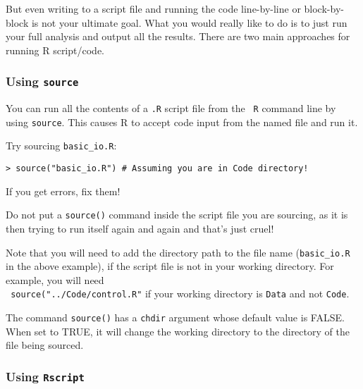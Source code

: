 But even writing to a script file and running the code line-by-line or 
block-by-block is not your ultimate goal. What you would really like to 
do is to just run your full analysis and output all the results. There 
are two main approaches for running R script/code.

\subsubsection{Using {\tt source}}


You can run all the contents of a {\tt *.R} script file from the {\tt 
R} command line by using {\tt source}. This causes R to accept code 
input from the named file and run it.
\begin{compactitem}[$\quad\star$]
	\item Try sourcing {\tt basic\_io.R}: 
\end{compactitem}

\begin{lstlisting}
> source("basic_io.R") # Assuming you are in Code directory!
\end{lstlisting}
\begin{compactitem}[$\quad\star$]
	\item If you get errors, fix them!
\end{compactitem}

\begin{tipbox}
Do not put a {\tt source()} command inside the script file you are 
sourcing, as it is then trying to run itself again and again and that's 
just cruel!
\end{tipbox}

Note that you will need to add the directory path to the file name 
({\tt basic\_io.R} in the above example), if the script file is not in 
your working directory. For example, you will need \\{\tt 
source("../Code/control.R"} if your working directory is {\tt Data} and 
not {\tt Code}.

\begin{tipbox}
The command {\tt source()} has a {\tt chdir} argument whose default 
value is FALSE. When set to TRUE, it will change the working directory 
to the directory of the file being sourced.  
\end{tipbox}

\subsubsection{Using {\tt Rscript}}

